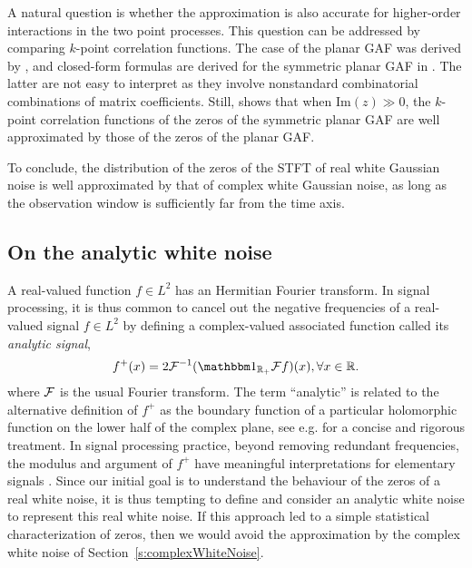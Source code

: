 A natural question is whether the approximation is also accurate for
higher-order interactions in the two point processes. This question can be
addressed by comparing $k$-point correlation functions. The case of the planar
GAF was derived by \cite{Han98}, and closed-form formulas are derived for the
symmetric planar GAF in \cite[Equation (12)]{Pro96}. The latter are not easy to
interpret as they involve nonstandard combinatorial combinations of matrix
coefficients. Still, \cite[Equation 25]{Pro96} shows that when $\text{Im}(z)\gg 0$, the
$k$-point correlation functions of the zeros of the symmetric planar GAF are
well approximated by those of the zeros of the planar GAF. 

To conclude, the distribution of the zeros of the STFT of real white Gaussian
noise is well approximated by that of complex white Gaussian noise, as long as
the observation window is sufficiently far from the time axis. 


\subsection{On the analytic white noise}
\label{s:analytic}
A real-valued function $f\in L^2$ has an Hermitian Fourier transform. In signal
processing, it is thus common to cancel out the negative frequencies of a
real-valued signal $f \in L^2$ by defining a complex-valued associated function called its \emph{analytic signal},
\begin{equation}
f^+(x) = 2 \cF^{-1}(\IND_{\mathbb{R}_+}\cF f)(x), \forall x\in\mathbb{R}.
\end{equation}
where $\mathcal{F}$ is the usual Fourier transform. The term ``analytic'' is related to
the alternative definition of $f^+$ as the boundary function of a particular holomorphic function on the lower half of the
complex plane, see e.g. \cite[Section 2.1]{Pug82} for a concise and rigorous treatment. In signal processing practice, beyond removing redundant
frequencies, the modulus and argument of $f^+$ have meaningful interpretations
for elementary signals
 \citep{Pic97}. Since our initial goal is to understand the behaviour of the zeros of a
real white noise, it is thus tempting to define and consider an
analytic white noise to represent this real white noise. If this approach led to
a simple statistical characterization of zeros, then we would avoid the
approximation by the complex white noise of Section~\ref{s:complexWhiteNoise}.

